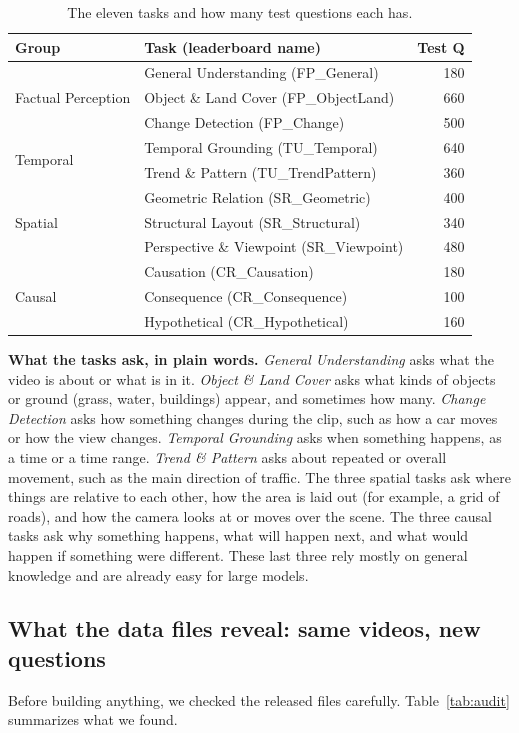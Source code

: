 \begin{table}[t]
\centering
\caption{The eleven tasks and how many test questions each has.}
\label{tab:tasks}
\footnotesize
\begin{tabular}{@{}llr@{}}
\toprule
Group & Task (leaderboard name) & Test Q \\
\midrule
\multirow{3}{*}{Factual Perception} & General Understanding (FP\_General) & 180 \\
 & Object \& Land Cover (FP\_ObjectLand) & 660 \\
 & Change Detection (FP\_Change) & 500 \\
\midrule
\multirow{2}{*}{Temporal} & Temporal Grounding (TU\_Temporal) & 640 \\
 & Trend \& Pattern (TU\_TrendPattern) & 360 \\
\midrule
\multirow{3}{*}{Spatial} & Geometric Relation (SR\_Geometric) & 400 \\
 & Structural Layout (SR\_Structural) & 340 \\
 & Perspective \& Viewpoint (SR\_Viewpoint) & 480 \\
\midrule
\multirow{3}{*}{Causal} & Causation (CR\_Causation) & 180 \\
 & Consequence (CR\_Consequence) & 100 \\
 & Hypothetical (CR\_Hypothetical) & 160 \\
\bottomrule
\end{tabular}
\end{table}

\textbf{What the tasks ask, in plain words.}
\emph{General Understanding} asks what the video is about or what is in it.
\emph{Object \& Land Cover} asks what kinds of objects or ground (grass,
water, buildings) appear, and sometimes how many. \emph{Change Detection}
asks how something changes during the clip, such as how a car moves or how
the view changes. \emph{Temporal Grounding} asks when something happens, as
a time or a time range. \emph{Trend \& Pattern} asks about repeated or
overall movement, such as the main direction of traffic. The three spatial
tasks ask where things are relative to each other, how the area is laid
out (for example, a grid of roads), and how the camera looks at or moves
over the scene. The three causal tasks ask why something happens, what will
happen next, and what would happen if something were different. These last
three rely mostly on general knowledge and are already easy for large
models.

\subsection{What the data files reveal: same videos, new questions}
Before building anything, we checked the released files carefully.
Table~\ref{tab:audit} summarizes what we found.

